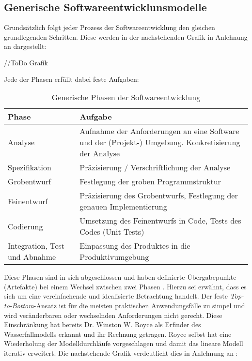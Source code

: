 \subsection{Generische Softwareentwicklunsmodelle}
\label{Generische Softwareentwicklunsmodelle}
Grundsätzlich folgt jeder Prozess der Softwareentwicklung den gleichen grundlegenden Schritten. Diese werden in der nachstehenden Grafik in Anlehnung an \cite[Abb. 9.1]{Ludwig_Lichter_2013} dargestellt:

//ToDo Grafik

Jede der Phasen erfüllt dabei feste Aufgaben:
    \begin{table}[!h]
        \centering
        \begin{tabular}{|p{4cm}|p{8cm}|}
            \hline
            Phase & Aufgabe\\
            \hline
            Analyse & Aufnahme der Anforderungen an eine Software und der (Projekt-) Umgebung. \glqq{}Konkretisierung der Analyse\grqq{} \cite[S. 155]{Ludwig_Lichter_2013}\\
            \hline
            Spezifikation & Präzisierung / Verschriftlichung der Analyse\\
            \hline
            Grobentwurf & Festlegung der groben Programmstruktur\\
            \hline
            Feinentwurf & Präzisierung des Grobentwurfs, Festlegung der genauen Implementierung\\
            \hline
            Codierung & Umsetzung des Feinentwurfs in Code, Tests des Codes (Unit-Tests)\\
            \hline
            Integration, Test und Abnahme & Einpassung des Produktes in die Produktivumgebung\\
            \hline
        \end{tabular}
            \caption{Generische Phasen der Softwareentwicklung}
            \label{Generische Phasen der Softwareentwicklung}
    \end{table}

Diese Phasen sind in sich abgeschlossen und haben definierte Übergabepunkte (Artefakte) bei einem Wechsel zwischen zwei Phasen \cite[S. 155]{Ludwig_Lichter_2013}. Hierzu sei erwähnt, dass es sich um eine vereinfachende und idealisierte Betrachtung handelt. Der feste \textit{Top-to-Bottom}-Ansatz ist für die meisten praktischen Anwendungsfälle zu simpel und wird veränderbaren oder wechselnden Anforderungen nicht gerecht. Diese Einschränkung hat bereits  Dr. Winston W. Royce als Erfinder des Wasserfallmodells \cite{royce1987managing} erkannt und ihr Rechnung getragen. Royce selbst hat eine Wiederholung der Modelldurchläufe vorgeschlagen \cite{Larmann_Basili_2003} und damit das lineare Modell iterativ erweitert. Die nachstehende Grafik verdeutlicht dies in Anlehnung an \cite[Abb. 3]{royce1987managing}:

